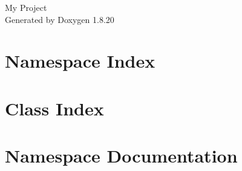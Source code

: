 \let\mypdfximage\pdfximage\def\pdfximage{\immediate\mypdfximage}\documentclass[twoside]{book}
\newcommand{\+}{\discretionary{\mbox{\scriptsize$\hookleftarrow$}}{}{}}
\newcommand{\clearemptydoublepage}{%
  \newpage{\pagestyle{empty}\cleardoublepage}%
}
\begin{document}
\hypersetup{pageanchor=false,
             bookmarksnumbered=true,
             pdfencoding=unicode
            }
\begin{titlepage}
\vspace*{7cm}
\begin{center}%
{\Large My Project }\\
\vspace*{1cm}
{\large Generated by Doxygen 1.8.20}\\
\end{center}
\end{titlepage}
\clearemptydoublepage
{}
\tableofcontents
\clearemptydoublepage
{}
\hypersetup{pageanchor=true}

\chapter{Namespace Index}

\chapter{Class Index}

\chapter{Namespace Documentation}




\end{document}
